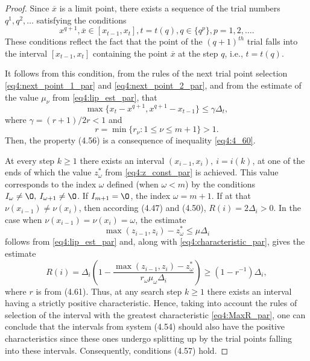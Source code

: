 \documentclass[graybox]{svmult}
\begin{document}
\begin{proof}
  Since $\overline x$ is a limit point, there exists a sequence of the trial numbers $q^1,q^2,\dots$ satisfying the conditions
  \begin{equation}
    x^{q+1},\overline x\in[x_{t-1},x_t], t=t(q),q\in\{q^p\},p=1,2,\dots.
  \end{equation}
  These conditions reflect the fact that the point of the $(q+1)^{th}$ trial falls into the interval $[x_{t-1},x_t]$ containing the point $\overline x$ at the step $q$, i.e., $t=t(q)$.

  It follows from this condition, from the rules of the next trial point selection \eqref{eq4:next_point_1_par} and \eqref{eq4:next_point_2_par}, and from the estimate of the value $\mu_\nu$ from \eqref{eq4:lip_est_par}, that
  \begin{equation}
    \label{eq4:4_60}
    \max\{x_t-x^{q+1},x^{q+1}-x_{t-1}\}\le\gamma \Delta_t,
  \end{equation}
  where $\gamma=(r+1)/2r<1$ and
  \begin{equation}
    r=\min\{r_\nu:1\le\nu\le m+1\}>1.
  \end{equation}
  Then, the property (4.56) is a consequence of inequality \eqref{eq4:4_60}.

  At every step $k\ge 1$ there exists an interval $(x_{i-1},x_i), \:i=i(k)$, at one of the ends of which the value $z^*_\omega$ from \eqref{eq4:z_const_par} is achieved. This value corresponds to the index $\omega$ defined (when $\omega<m$) by the conditions $I_\omega\not=\O,\: I_{\omega+1}\not=\O$. If $I_{m+1}=\O$, the index $\omega=m+1$. If at that $\nu(x_{i -1} )\not = \nu(x_i )$, then according (4.47) and (4.50), $R(i)=2\Delta_i>0$. In the case when $\nu(x_{i -1} )= \nu(x_i )=\omega$, the estimate
  \begin{displaymath}
    \max(z_{i-1}, z_i)-z^*_\omega\le\mu\Delta_i
  \end{displaymath}
  follows from \eqref{eq4:lip_est_par} and, along with \eqref{eq4:characteristic_par}, gives the estimate
  \begin{displaymath}
    R(i)=\Delta_i\left(1-\frac{\max(z_{i-1},z_i)-z^*_\omega}{r_\omega\mu_\omega\Delta_i}\right)\ge (1-r^{-1})\Delta_i,
  \end{displaymath}
  where $r$ is from (4.61). Thus, at any search step $k\ge 1$ there exists an interval having a strictly positive characteristic. Hence, taking into account the rules of selection of the interval with the greatest characteristic \eqref{eq4:MaxR_par}, one can conclude that the intervals from system (4.54) should also have the positive characteristics since these ones undergo splitting up by the trial points falling into these intervals. Consequently, conditions (4.57) hold.


\end{proof}
\end{document}
